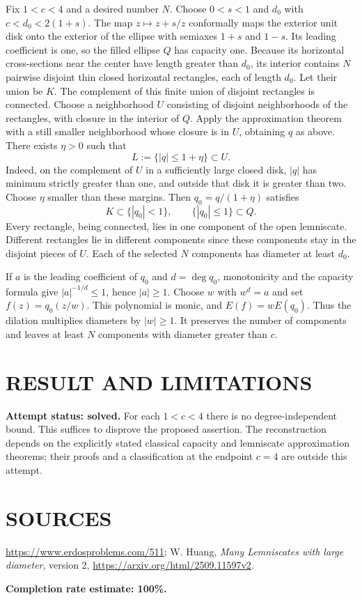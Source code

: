 Fix $1<c<4$ and a desired number $N$. Choose $0<s<1$ and $d_0$ with
$c<d_0<2(1+s)$. The map $z\mapsto z+s/z$ conformally maps the exterior unit disk onto the exterior of the ellipse with semiaxes $1+s$ and $1-s$. Its leading coefficient is one, so the filled ellipse $Q$ has capacity one. Because its horizontal cross-sections near the center have length greater than $d_0$, its interior contains $N$ pairwise disjoint thin closed horizontal rectangles, each of length $d_0$. Let their union be $K$. The complement of this finite union of disjoint rectangles is connected.
Choose a neighborhood $U$ consisting of disjoint neighborhoods of the rectangles, with closure in the interior of $Q$. Apply the approximation theorem with a still smaller neighborhood whose closure is in $U$, obtaining $q$ as above. There exists $\eta>0$ such that
\[
 L:=\{|q|\leq1+\eta\}\subset U.
\]
Indeed, on the complement of $U$ in a sufficiently large closed disk, $|q|$ has minimum strictly greater than one, and outside that disk it is greater than two. Choose $\eta$ smaller than these margins. Then $q_0=q/(1+\eta)$ satisfies
\[
 K\subset\{|q_0|<1\},\qquad \{|q_0|\leq1\}\subset Q.
\]
Every rectangle, being connected, lies in one component of the open lemniscate. Different rectangles lie in different components since these components stay in the disjoint pieces of $U$. Each of the selected $N$ components has diameter at least $d_0$.

If $a$ is the leading coefficient of $q_0$ and $d=\deg q_0$, monotonicity and the capacity formula give $|a|^{-1/d}\leq1$, hence $|a|\geq1$. Choose $w$ with $w^d=a$ and set $f(z)=q_0(z/w)$. This polynomial is monic, and $E(f)=wE(q_0)$. Thus the dilation multiplies diameters by $|w|\geq1$. It preserves the number of components and leaves at least $N$ components with diameter greater than $c$.

\section{RESULT AND LIMITATIONS}
\textbf{Attempt status: solved.} For each $1<c<4$ there is no degree-independent bound. This suffices to disprove the proposed assertion. The reconstruction depends on the explicitly stated classical capacity and lemniscate approximation theorems; their proofs and a classification at the endpoint $c=4$ are outside this attempt.

\section{SOURCES}
\url{https://www.erdosproblems.com/511}; W. Huang, \emph{Many Lemniscates with large diameter}, version 2, \url{https://arxiv.org/html/2509.11597v2}.

\textbf{Completion rate estimate: 100\%.}
